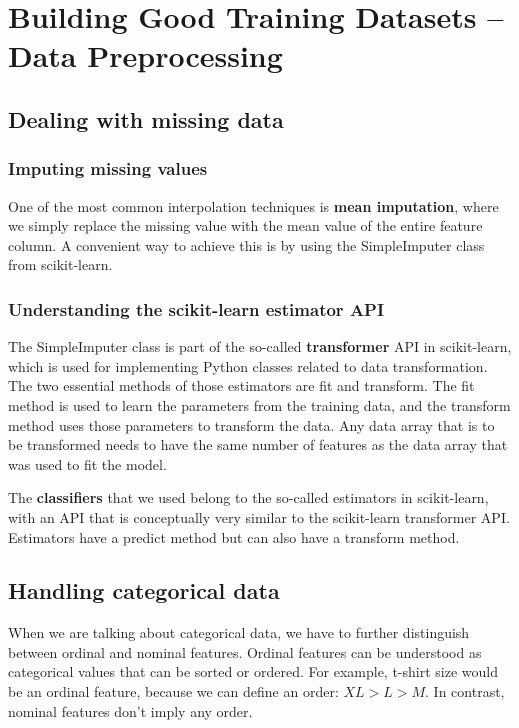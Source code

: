 \chapter{Building Good Training Datasets – Data Preprocessing}
\section{Dealing with missing data}
\subsection{Imputing missing values}
One of the most common interpolation techniques is \textbf{mean imputation}, where we simply replace the missing value with the mean value of the entire feature column. A convenient way to achieve this is by using the SimpleImputer class from scikit-learn.
\subsection{Understanding the scikit-learn estimator API}
The SimpleImputer class is part of the so-called \textbf{transformer} API in scikit-learn, which is used for implementing Python classes related to data transformation. The two essential methods of those estimators are fit and transform. The fit method is used to learn the parameters from the training data, and the transform method uses those parameters to transform the data. Any data array that is to be transformed needs to have the same number of features as the data array that was used to fit the model.


The \textbf{classifiers} that we used belong to the so-called estimators in scikit-learn, with an API that is conceptually very similar to the scikit-learn transformer API. Estimators have a predict method but can also have a transform method.

\section{Handling categorical data}
When we are talking about categorical data, we have to further distinguish between ordinal and nominal features. Ordinal features can be understood as categorical values that can be sorted or ordered. For example, t-shirt size would be an ordinal feature, because we can define an order: $XL > L > M$. In contrast, nominal features don't imply any order.
